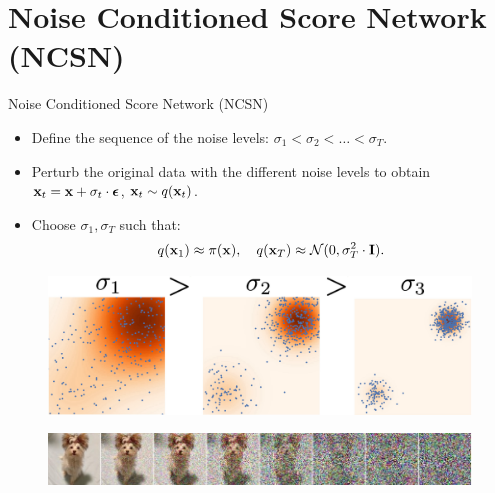 \section{Noise Conditioned Score Network (NCSN)}
\begin{frame}{Noise Conditioned Score Network (NCSN)}
	\begin{itemize}
		\item Define the sequence of the noise levels: $\sigma_1 < \sigma_2 < \dots < \sigma_T$.
		\item Perturb the original data with the different noise levels to obtain $\mathbf{x}_t = \mathbf{x} + \sigma_t \cdot \boldsymbol{\epsilon}$, $\mathbf{x}_t \sim q(\mathbf{x}_t)$. 
		\item Choose $\sigma_1, \sigma_T$ such that:
		\[
			q(\mathbf{x}_1) \approx \pi(\mathbf{x}), \quad q(\mathbf{x}_T) \approx \mathcal{N}(0, \sigma_T^2 \cdot \mathbf{I}).
		\]
	\end{itemize}
	\begin{figure}
		\includegraphics[width=0.6\linewidth]{figs/multi_scale}
	\end{figure}
	\begin{figure}
		\includegraphics[width=\linewidth]{figs/duoduo}
	\end{figure}
\end{frame}
